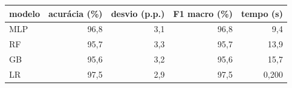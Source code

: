 
\begin{tabular}{lrrrr}
\toprule
\textbf{modelo} & \textbf{acurácia (\%)} & \textbf{desvio (p.p.)} & \textbf{F1 macro (\%)} & \textbf{tempo (s)} \\
\midrule
MLP & 96{,}8 & 3{,}1 & 96{,}8 & 9{,}4 \\
RF & 95{,}7 & 3{,}3 & 95{,}7 & 13{,}9 \\
GB & 95{,}6 & 3{,}2 & 95{,}6 & 15{,}7 \\
LR & 97{,}5 & 2{,}9 & 97{,}5 & 0{,}200 \\
\bottomrule
\end{tabular}
